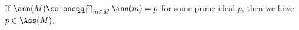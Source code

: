 If $\ann(M)\coloneqq\bigcap_{m \in M}\ann(m) = p$ for some prime ideal $p$, then
we have $p \in \Ass(M)$.
